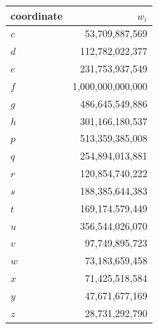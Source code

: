 \begin{tabular}{@{}lr@{}}
\toprule
coordinate & $w_i$\\
\midrule
$c$ & 53,709,887,569 \\
$d$ & 112,782,022,377 \\
$e$ & 231,753,937,549 \\
$f$ & 1,000,000,000,000 \\
$g$ & 486,645,549,886 \\
$h$ & 301,166,180,537 \\
$p$ & 513,359,385,008 \\
$q$ & 254,894,013,881 \\
$r$ & 120,854,740,222 \\
$s$ & 188,385,644,383 \\
$t$ & 169,174,579,449 \\
$u$ & 356,544,026,070 \\
$v$ & 97,749,895,723 \\
$w$ & 73,183,659,458 \\
$x$ & 71,425,518,584 \\
$y$ & 47,671,677,169 \\
$z$ & 28,731,292,790 \\
\bottomrule
\end{tabular}
